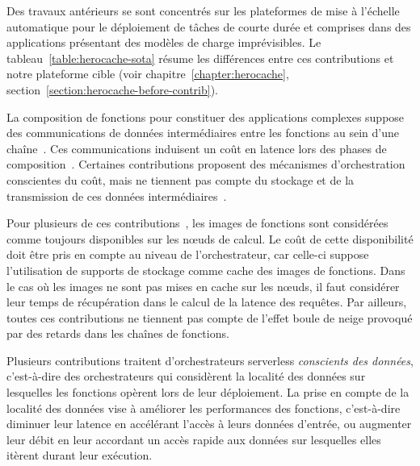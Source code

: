 
Des travaux antérieurs se sont concentrés sur les plateformes de mise à l'échelle automatique pour le déploiement de tâches de courte durée et comprises dans des applications présentant des modèles de charge imprévisibles. Le tableau~\ref{table:herocache-sota} résume les différences entre ces contributions et notre plateforme cible (voir chapitre~\ref{chapter:herocache}, section~\ref{section:herocache-before-contrib}).

La composition de fonctions pour constituer des applications complexes suppose des communications de données intermédiaires entre les fonctions au sein d'une chaîne~\cite{vaneykSPECRGReferenceArchitecture2019}. Ces communications induisent un coût en latence lors des phases de composition~\cite{jiaNightcoreEfficientScalable2021}. Certaines contributions proposent des mécanismes d'orchestration conscientes du coût, mais ne tiennent pas compte du stockage et de la transmission de ces données intermédiaires~\cite{zhangFIRSTExploitingMultiDimensional2023, zijunFassflowEfficient2022, herofake}.

Pour plusieurs de ces contributions~\cite{bhasiCypressInputSizesensitive2022, zijunFassflowEfficient2022, smithFaDOFaaSFunctions2022, zhangFIRSTExploitingMultiDimensional2023}, les images de fonctions sont considérées comme toujours disponibles sur les nœuds de calcul. Le coût de cette disponibilité doit être pris en compte au niveau de l'orchestrateur, car celle-ci suppose l'utilisation de supports de stockage comme cache des images de fonctions. Dans le cas où les images ne sont pas mises en cache sur les nœuds, il faut considérer leur temps de récupération dans le calcul de la latence des requêtes. Par ailleurs, toutes ces contributions ne tiennent pas compte de l'effet boule de neige provoqué par des retards dans les chaînes de fonctions.

Plusieurs contributions traitent d'orchestrateurs serverless \textit{conscients des données}, c'est-à-dire des orchestrateurs qui considèrent la localité des données sur lesquelles les fonctions opèrent lors de leur déploiement. La prise en compte de la localité des données vise à améliorer les performances des fonctions, c'est-à-dire diminuer leur latence en accélérant l'accès à leurs données d'entrée, ou augmenter leur débit en leur accordant un accès rapide aux données sur lesquelles elles itèrent durant leur exécution.

